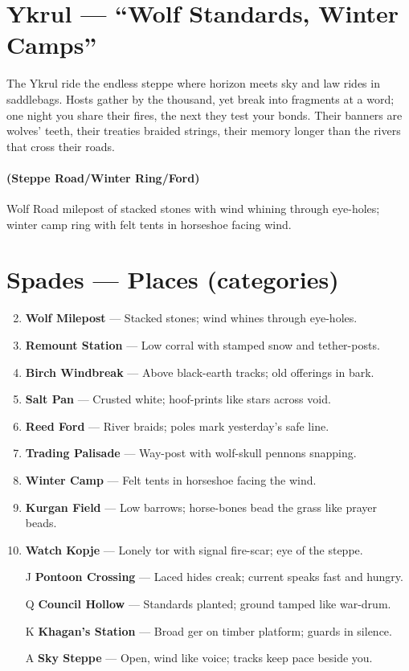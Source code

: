 \section{Ykrul --- ``Wolf Standards, Winter Camps''}
\label{chap:ykrul}

\begin{tcolorbox}[colback=black!3,colframe=black!40!white,title={Theme \& Atmosphere}]
The Ykrul ride the endless steppe where horizon meets sky and law rides in saddlebags. Hosts gather by the thousand, yet break into fragments at a word; one night you share their fires, the next they test your bonds. Their banners are wolves' teeth, their treaties braided strings, their memory longer than the rivers that cross their roads.
\end{tcolorbox}

\paragraph*{(Steppe Road/Winter Ring/Ford)} Wolf Road milepost of stacked stones with wind whining through eye-holes; winter camp ring with felt tents in horseshoe facing wind.

\section*{Spades --- Places (categories)}
\label{sec:ykrul-places}
\begin{enumerate}
\setcounter{enumi}{1}
\item \textbf{Wolf Milepost} --- Stacked stones; wind whines through eye-holes.
\item \textbf{Remount Station} --- Low corral with stamped snow and tether-posts.
\item \textbf{Birch Windbreak} --- Above black-earth tracks; old offerings in bark.
\item \textbf{Salt Pan} --- Crusted white; hoof-prints like stars across void.
\item \textbf{Reed Ford} --- River braids; poles mark yesterday's safe line.
\item \textbf{Trading Palisade} --- Way-post with wolf-skull pennons snapping.
\item \textbf{Winter Camp} --- Felt tents in horseshoe facing the wind.
\item \textbf{Kurgan Field} --- Low barrows; horse-bones bead the grass like prayer beads.
\item \textbf{Watch Kopje} --- Lonely tor with signal fire-scar; eye of the steppe.
\item[J] \textbf{Pontoon Crossing} --- Laced hides creak; current speaks fast and hungry.
\item[Q] \textbf{Council Hollow} --- Standards planted; ground tamped like war-drum.
\item[K] \textbf{Khagan's Station} --- Broad ger on timber platform; guards in silence.
\item[A] \textbf{Sky Steppe} --- Open, wind like voice; tracks keep pace beside you.
\end{enumerate}

